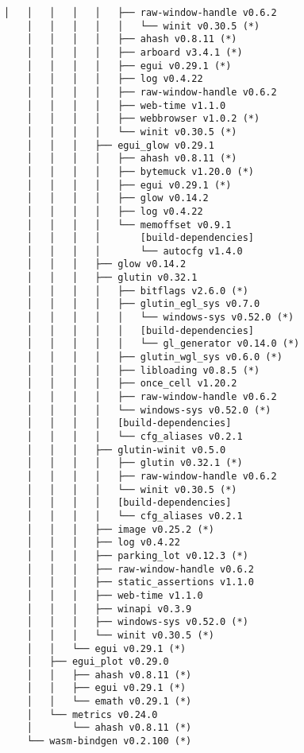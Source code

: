 \begin{lstlisting}[style=mystyle, caption={dependencias del proyecto}, label={lst:dependencias}]
    │   │   │   │   │   ├── raw-window-handle v0.6.2
    │   │   │   │   │   └── winit v0.30.5 (*)
    │   │   │   │   ├── ahash v0.8.11 (*)
    │   │   │   │   ├── arboard v3.4.1 (*)
    │   │   │   │   ├── egui v0.29.1 (*)
    │   │   │   │   ├── log v0.4.22
    │   │   │   │   ├── raw-window-handle v0.6.2
    │   │   │   │   ├── web-time v1.1.0
    │   │   │   │   ├── webbrowser v1.0.2 (*)
    │   │   │   │   └── winit v0.30.5 (*)
    │   │   │   ├── egui_glow v0.29.1
    │   │   │   │   ├── ahash v0.8.11 (*)
    │   │   │   │   ├── bytemuck v1.20.0 (*)
    │   │   │   │   ├── egui v0.29.1 (*)
    │   │   │   │   ├── glow v0.14.2
    │   │   │   │   ├── log v0.4.22
    │   │   │   │   └── memoffset v0.9.1
    │   │   │   │       [build-dependencies]
    │   │   │   │       └── autocfg v1.4.0
    │   │   │   ├── glow v0.14.2
    │   │   │   ├── glutin v0.32.1
    │   │   │   │   ├── bitflags v2.6.0 (*)
    │   │   │   │   ├── glutin_egl_sys v0.7.0
    │   │   │   │   │   └── windows-sys v0.52.0 (*)
    │   │   │   │   │   [build-dependencies]
    │   │   │   │   │   └── gl_generator v0.14.0 (*)
    │   │   │   │   ├── glutin_wgl_sys v0.6.0 (*)
    │   │   │   │   ├── libloading v0.8.5 (*)
    │   │   │   │   ├── once_cell v1.20.2
    │   │   │   │   ├── raw-window-handle v0.6.2
    │   │   │   │   └── windows-sys v0.52.0 (*)
    │   │   │   │   [build-dependencies]
    │   │   │   │   └── cfg_aliases v0.2.1
    │   │   │   ├── glutin-winit v0.5.0
    │   │   │   │   ├── glutin v0.32.1 (*)
    │   │   │   │   ├── raw-window-handle v0.6.2
    │   │   │   │   └── winit v0.30.5 (*)
    │   │   │   │   [build-dependencies]
    │   │   │   │   └── cfg_aliases v0.2.1
    │   │   │   ├── image v0.25.2 (*)
    │   │   │   ├── log v0.4.22
    │   │   │   ├── parking_lot v0.12.3 (*)
    │   │   │   ├── raw-window-handle v0.6.2
    │   │   │   ├── static_assertions v1.1.0
    │   │   │   ├── web-time v1.1.0
    │   │   │   ├── winapi v0.3.9
    │   │   │   ├── windows-sys v0.52.0 (*)
    │   │   │   └── winit v0.30.5 (*)
    │   │   └── egui v0.29.1 (*)
    │   ├── egui_plot v0.29.0
    │   │   ├── ahash v0.8.11 (*)
    │   │   ├── egui v0.29.1 (*)
    │   │   └── emath v0.29.1 (*)
    │   └── metrics v0.24.0
    │       └── ahash v0.8.11 (*)
    └── wasm-bindgen v0.2.100 (*)
    
\end{lstlisting}
